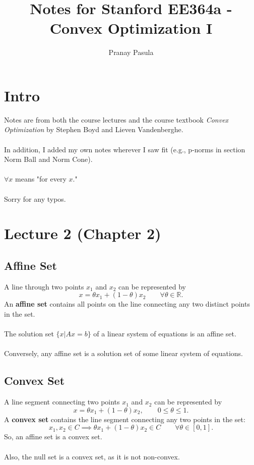 \documentclass[]{article}
\title{Notes for Stanford EE364a - Convex Optimization I}
\author{Pranay Pasula}
\begin{document}
\maketitle

\section*{Intro}
Notes are from both the course lectures and the course textbook \textit{Convex Optimization} by Stephen Boyd and Lieven Vandenberghe. 
\\\\
In addition, I added my own notes wherever I saw fit (e.g., p-norms in section Norm Ball and Norm Cone). 
\\\\ 
$\forall x$ means "for every $x$." 
\\\\
Sorry for any typos.
\\
\section*{Lecture 2 (Chapter 2)}

\subsection*{Affine Set}
A line through two points $x_{1}$ and $x_{2}$ can be represented by $$x=\theta x_{1} + (1-\theta) x_{2} \qquad \forall \theta \in \mathbb{R}. $$
An \textbf{affine set} contains all points on the line connecting any two distinct points in the set. \\\\
The solution set $\{x|Ax=b\}$ of a linear system of equations is an affine set. \\\\
Conversely, any affine set is a solution set of some linear system of equations. \\

\subsection*{Convex Set}
A line segment connecting two points $x_{1}$ and $x_{2}$ can be represented by $$x=\theta x_{1} + (1-\theta) x_{2}, \qquad  0\leq \theta \leq 1.$$
A \textbf{convex set} contains the line segment connecting any two points in the set:  $$x_{1}, x_{2} \in C \implies \theta x_{1} + (1-\theta) x_{2} \in C \qquad \forall \theta \in [0,1].$$
So, an affine set is a convex set. \\\\
Also, the null set is a convex set, as it is not non-convex. \\
\end{document}
